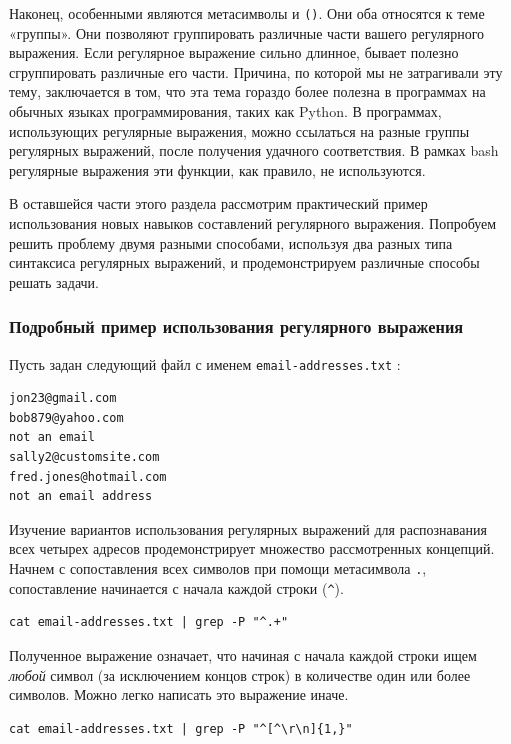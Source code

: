 \documentclass[12pt]{article}
\begin{document}
Наконец, особенными являются метасимволы
\texttt{\textbar{}} и \texttt{()}. Они оба относятся к теме
«группы». Они позволяют группировать различные части вашего
регулярного выражения. Если регулярное выражение сильно длинное, бывает
полезно сгруппировать различные его части. Причина, по которой мы не
затрагивали эту тему, заключается в том, что эта тема гораздо более
полезна в программах на обычных языках программирования, таких как Python.
В программах, использующих регулярные выражения, можно ссылаться на
разные группы регулярных выражений, после получения удачного
соответствия. В рамках bash регулярные выражения эти функции, как
правило, не используются.


В оставшейся части этого раздела рассмотрим практический пример
использования новых навыков составлений регулярного выражения. Попробуем
решить проблему двумя разными способами, используя два разных типа
синтаксиса регулярных выражений, и продемонстрируем различные способы
решать задачи.

\hypertarget{Detailed-Example-Regular-Expression}{%
\subsubsection{\texorpdfstring{\protect\hyperlink{Detailed-Example-Regular-Expression}{}Подробный
пример использования регулярного
выражения}{Подробный пример использования регулярного выражения}}\label{Detailed-Example-Regular-Expression}}

Пусть задан следующий файл с именем \texttt{email-addresses.txt} :
\begin{verbatim}
jon23@gmail.com
bob879@yahoo.com
not an email
sally2@customsite.com
fred.jones@hotmail.com
not an email address
\end{verbatim}
Изучение вариантов использования регулярных выражений для распознавания
всех четырех адресов продемонстрирует множество рассмотренных концепций.
Начнем с сопоставления всех символов при помощи метасимвола \texttt{.},
сопоставление начинается с начала каждой строки (\texttt{\^{}}).
\begin{verbatim}
cat email-addresses.txt | grep -P "^.+"
\end{verbatim}

Полученное выражение означает, что начиная с
начала каждой строки ищем \emph{любой} символ (за исключением концов
строк) в количестве один или более символов. Можно легко написать это
выражение иначе.
\begin{verbatim}
cat email-addresses.txt | grep -P "^[^\r\n]{1,}"
\end{verbatim}
\end{document}
